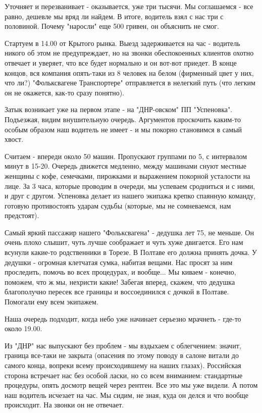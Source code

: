 Уточняет и перезванивает - оказывается, уже три тысячи. Мы соглашаемся - все
равно, дешевле мы вряд ли найдем. В итоге, водитель взял с нас три с половиной.
Почему "наросли" еще 500 гривен, он объяснить не смог.

Стартуем в 14.00 от Крытого рынка. Выезд задерживается на час - водитель никого
об этом не предупреждает, но на звонки обеспокоенных клиентов охотно отвечает и
уверяет, что все будет нормально и он вот-вот приедет. В конце концов, вся
компания опять-таки из 8 человек на белом (фирменный цвет у них, что ли?)
"Фольксвагене Транспортере" отправляется в нелегкий путь (что легким он не
окажется, как-то сразу понятно).

Затык возникает уже на первом этапе - на "ДНР-овском" ПП "Успеновка".
Подъезжая, видим внушительную очередь. Аргументов проскочить каким-то особым
образом наш водитель не имеет - и мы покорно становимся в самый хвост.

Считаем - впереди около 50 машин. Пропускают группами по 5, с интервалом минут
в 15-20. Очередь движется медленно, между машинами снуют местные женщины с
кофе, семечками, пирожками и выражением покорной усталости на лице. За 3 часа,
которые проводим в очереди, мы успеваем сродниться и с ними, и друг с другом.
Успеновка делает из нашего экипажа крепко спаянную команду, готовую
противостоять ударам судьбы (которые, мы не сомневаемся, нам предстоят).

Самый яркий пассажир нашего "Фольксвагена" - дедушка лет 75, не меньше. Он
очень плохо слышит, чуть лучше соображает и чуть хуже двигается. Его нам
всунули какие-то родственники в Торезе. В Полтаве его должна принять дочка. У
дедушки - огромная клетчатая сумка, набитая вещами. Нас просят за ним
проследить, помочь во всех процедурах, и вообще... Мы киваем - конечно,
поможем, что ж мы, нехристи какие! Забегая вперед, скажем, что дедушка
благополучно пересек все границы и воссоединился с дочкой в Полтаве. Помогали
ему всем экипажем.

Наша очередь подходит, когда небо уже начинает серьезно мрачнеть - где-то около
19.00.

Из "ДНР" нас выпускают без проблем - мы вздыхаем с облегчением: значит, граница
все-таки не закрыта (опасения по этому поводу в салоне витали до самого конца,
вопреки всему происходившему на наших глазах). Российская сторона встречает нас
без особой ласки, но со всем вниманием: стандартные процедуры, опять досмотр
вещей через рентген. Все это мы уже видели. А потом наш водитель исчезает на
час. Мы сидим, не зная, куда он делся и что вообще происходит. На звонки он не
отвечает.

